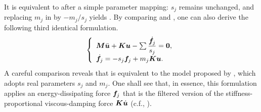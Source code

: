 It is equivalent to  after a simple parameter mapping: $s_j$ remains unchanged, and replacing $m_j$ in  by $-m_j/s_j$ yields .
By comparing  and , one can also derive the following third identical formulation.
\begin{gather}\label{eq:vel_formulation_alter}
\left\{\begin{array}{l}
\bm{M}\ddot{\bm{u}}+\bm{K}\bm{u}-\sum\dfrac{\dot{\bm{f}}_j}{s_j}=\bm{0}, \\
\dot{\bm{f}}_j=-s_j\bm{f}_j+m_j\bm{K}\bm{u}.
\end{array}\right.
\end{gather}
A careful comparison reveals that  is equivalent to the model proposed by \citet{Huang2019}, which adopts real parameters $s_j$ and $m_j$.
One shall see that, in essence, this formulation applies an energy-dissipating force $\bm{f}_j$ that is the filtered version of the stiffness-proportional viscous-damping force $\bm{K}\dot{\bm{u}}$ (c.f., ).
